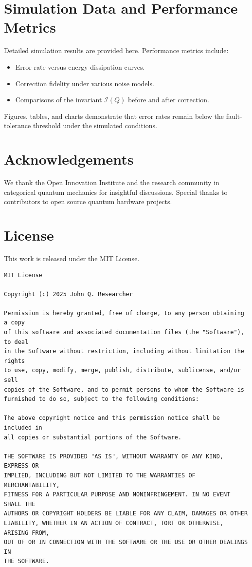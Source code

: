 \documentclass[11pt]{article}
\begin{document}
\appendix
\section{Simulation Data and Performance Metrics}
\label{app:simulations}
Detailed simulation results are provided here. Performance metrics include:
\begin{itemize}
    \item Error rate versus energy dissipation curves.
    \item Correction fidelity under various noise models.
    \item Comparisons of the invariant \(\mathcal{I}(Q)\) before and after correction.
\end{itemize}
Figures, tables, and charts demonstrate that error rates remain below the fault-tolerance threshold under the simulated conditions.

\section*{Acknowledgements}
We thank the Open Innovation Institute and the research community in categorical quantum mechanics for insightful discussions. Special thanks to contributors to open source quantum hardware projects.

\section*{License}
This work is released under the MIT License.
\begin{verbatim}
MIT License

Copyright (c) 2025 John Q. Researcher

Permission is hereby granted, free of charge, to any person obtaining a copy
of this software and associated documentation files (the "Software"), to deal
in the Software without restriction, including without limitation the rights
to use, copy, modify, merge, publish, distribute, sublicense, and/or sell
copies of the Software, and to permit persons to whom the Software is
furnished to do so, subject to the following conditions:

The above copyright notice and this permission notice shall be included in
all copies or substantial portions of the Software.

THE SOFTWARE IS PROVIDED "AS IS", WITHOUT WARRANTY OF ANY KIND, EXPRESS OR
IMPLIED, INCLUDING BUT NOT LIMITED TO THE WARRANTIES OF MERCHANTABILITY,
FITNESS FOR A PARTICULAR PURPOSE AND NONINFRINGEMENT. IN NO EVENT SHALL THE
AUTHORS OR COPYRIGHT HOLDERS BE LIABLE FOR ANY CLAIM, DAMAGES OR OTHER
LIABILITY, WHETHER IN AN ACTION OF CONTRACT, TORT OR OTHERWISE, ARISING FROM,
OUT OF OR IN CONNECTION WITH THE SOFTWARE OR THE USE OR OTHER DEALINGS IN
THE SOFTWARE.
\end{verbatim}



\end{document}
